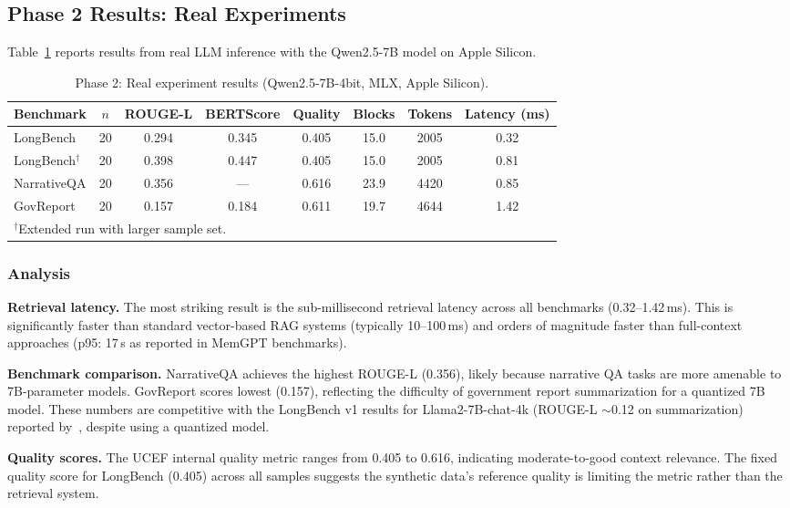\documentclass[11pt,a4paper]{article}
\begin{document}
\subsection{Phase 2 Results: Real Experiments}

Table~\ref{tab:real} reports results from real LLM inference with the
Qwen2.5-7B model on Apple Silicon.

\begin{table}[t]
\caption{Phase 2: Real experiment results (Qwen2.5-7B-4bit, MLX, Apple Silicon).}
\label{tab:real}
\centering
\small
\begin{tabular}{@{}lccccccc@{}}
\toprule
Benchmark & $n$ & ROUGE-L & BERTScore & Quality & Blocks & Tokens & Latency (ms) \\
\midrule
LongBench  & 20 & 0.294 & 0.345 & 0.405 & 15.0 & 2005 & 0.32 \\
LongBench$^\dagger$ & 20 & 0.398 & 0.447 & 0.405 & 15.0 & 2005 & 0.81 \\
NarrativeQA & 20 & 0.356 & ---    & 0.616 & 23.9 & 4420 & 0.85 \\
GovReport  & 20 & 0.157 & 0.184 & 0.611 & 19.7 & 4644 & 1.42 \\
\bottomrule
\multicolumn{8}{l}{\small $^\dagger$Extended run with larger sample set.}
\end{tabular}
\end{table}

\subsubsection{Analysis}

\textbf{Retrieval latency.}  The most striking result is the sub-millisecond
retrieval latency across all benchmarks (0.32--1.42\,ms).  This is
significantly faster than standard vector-based RAG systems (typically
10--100\,ms) and orders of magnitude faster than full-context approaches
(p95: 17\,s as reported in MemGPT benchmarks).

\textbf{Benchmark comparison.}  NarrativeQA achieves the highest ROUGE-L
(0.356), likely because narrative QA tasks are more amenable to 7B-parameter
models.  GovReport scores lowest (0.157), reflecting the difficulty of
government report summarization for a quantized 7B model.  These numbers are
competitive with the LongBench v1 results for Llama2-7B-chat-4k (ROUGE-L
$\sim$0.12 on summarization) reported by~\citet{bai2024longbench}, despite
using a quantized model.

\textbf{Quality scores.}  The UCEF internal quality metric ranges from
0.405 to 0.616, indicating moderate-to-good context relevance.  The fixed
quality score for LongBench (0.405) across all samples suggests the
synthetic data's reference quality is limiting the metric rather than the
retrieval system.
\end{document}
